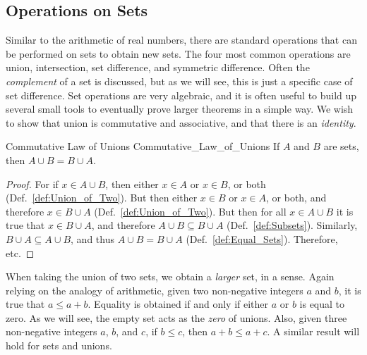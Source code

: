         \subsection{Operations on Sets}
            Similar to the arithmetic of real numbers, there
            are standard operations that can be performed on
            sets to obtain new sets. The four most common
            operations are union, intersection, set difference,
            and symmetric difference. Often the
            \textit{complement} of a set is discussed, but as
            we will see, this is just a specific case of set
            difference.
            Set operations are very algebraic, and it is often
            useful to build up several small tools to eventually
            prove larger theorems in a simple way. We wish to
            show that union is commutative and associative, and
            that there is an \textit{identity}.
            \begin{ltheorem}{Commutative Law of Unions}
                  {Commutative_Law_of_Unions}
                If $A$ and $B$ are sets, then
                $A\cup{B}=B\cup{A}$.
            \end{ltheorem}
            \begin{proof}
                For if $x\in{A}\cup{B}$, then either $x\in{A}$
                or $x\in{B}$, or both
                (Def.~\ref{def:Union_of_Two}). But then either
                $x\in{B}$ or $x\in{A}$, or both, and therefore
                $x\in{B}\cup{A}$ (Def.~\ref{def:Union_of_Two}).
                But then for all $x\in{A}\cup{B}$ it is true that
                $x\in{B}\cup{A}$, and therefore
                $A\cup{B}\subseteq{B}\cup{A}$
                (Def.~\ref{def:Subsets}). Similarly,
                $B\cup{A}\subseteq{A}\cup{B}$, and thus
                $A\cup{B}=B\cup{A}$ (Def.~\ref{def:Equal_Sets}).
                Therefore, etc.
            \end{proof}
            When taking the union of two sets, we obtain a
            \textit{larger} set, in a sense. Again relying on
            the analogy of arithmetic, given two non-negative
            integers $a$ and $b$, it is true that $a\leq{a}+b$.
            Equality is obtained if and only if either $a$ or
            $b$ is equal to zero. As we will see, the empty set
            acts as the \textit{zero} of unions. Also, given
            three non-negative integers $a$, $b$, and $c$, if
            $b\leq{c}$, then $a+b\leq{a}+c$. A similar result
            will hold for sets and unions.
